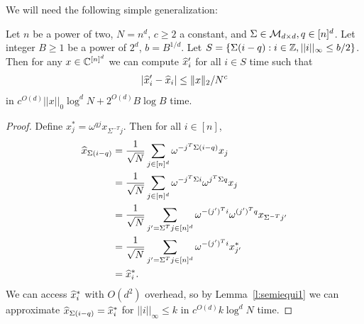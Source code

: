 We will need the following simple generalization:
\begin{corollary}\label{c:semiequi1}
  Let $n$ be a power of two, $N=n^d$, $c\geq 2$ a constant, and $\Sigma\in \gl, q\in \nsq$.  Let integer $B\geq 1$ be a power of $2^d$, $b=B^{1/d}$.
   Let $S = \{\Sigma(i - q) : i  \in \Z, ||i||_\infty \leq b/2\}$.  Then for any $x\in \C^\nsq$ we can compute $\wh{x}'_i$ for all
  $i \in S$ time such that
  \[
  \abs{\wh{x}'_i - \wh{x}_i} \leq \norm{2}{x} / N^c
  \]
in $c^{O(d)}||x||_0 \log^d N+2^{O(d)}B\log B$ time.  
\end{corollary}
\begin{proof}
Define
  $x^*_j = \omega^{qj}x_{\Sigma^{-T}j}$.  Then for all $i \in [n]$,
  \begin{align*}
    \wh{x}_{\Sigma(i-q)}
    &= \frac{1}{\sqrt{N}}\sum_{j \in \nsq} \omega^{-j^T\Sigma(i-q)}x_j\\
    &= \frac{1}{\sqrt{N}}\sum_{j \in \nsq} \omega^{-j^T\Sigma i}\omega^{j^T\Sigma q}x_j\\    
    &= \frac{1}{\sqrt{N}}\sum_{j'=\Sigma^{T}j \in \nsq} \omega^{-(j')^Ti}\omega^{(j')^Tq}x_{\Sigma^{-T}j'}\\    
    &= \frac{1}{\sqrt{N}}\sum_{j'=\Sigma^{T}j \in \nsq} \omega^{-(j')^Ti}x^*_{j'}\\        
    &= \wh{x}^*_i.
  \end{align*}
  We can access $\wh{x}^*_i$ with $O(d^2)$ overhead, so by
  Lemma~\ref{l:semiequi1} we can approximate $\wh{x}_{\Sigma(i-q)} =
  \wh{x}^*_i$ for $||i||_\infty \leq k$ in $c^{O(d)}k\log^d N$ time.
\end{proof}

